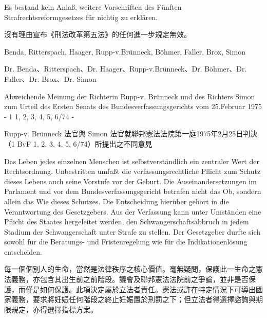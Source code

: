 \documentclass[12pt]{article}
\begin{document}
\syncleft
\begin{sourcepara}
Es bestand kein Anlaß, weitere Vorschriften des Fünften Strafrechtsreformgesetzes für nichtig zu erklären.
\end{sourcepara}
\begin{transpara}
沒有理由宣布《刑法改革第五法》的任何進一步規定無效。
\end{transpara}

\syncleft
\begin{sourcepara}
{\centering \abbrDr{} Benda, Ritterspach, \abbrDr{} Haager, Rupp-v.Brünneck, \abbrDr{} Böhmer, \abbrDr{} Faller, \abbrDr{} Brox, \abbrDr{} Simon\par}
\end{sourcepara}
\begin{transpara}
Dr. Benda、Ritterspach、Dr. Haager、Rupp-v.Brünneck、Dr. Böhmer、Dr. Faller、Dr. Brox、Dr. Simon
\end{transpara}

\syncleft
\begin{sourcepara}
Abweichende Meinung der Richterin Rupp-v. Brünneck und des Richters \abbrDr{} Simon zum Urteil des Ersten Senats des Bundesverfassungsgerichts vom 25.Februar 1975 - 1 \abbrBvF{} 1, 2, 3, 4, 5, 6/74 -
\end{sourcepara}
\begin{transpara}
Rupp-v. Brünneck 法官與 Simon 法官就聯邦憲法法院第一庭1975年2月25日判決（1 BvF 1, 2, 3, 4, 5, 6/74）所提出之不同意見
\end{transpara}

\syncleft
\begin{sourcepara}
Das Leben jedes einzelnen Menschen ist selbstverständlich ein zentraler Wert der Rechtsordnung. Unbestritten umfaßt die verfassungsrechtliche Pflicht zum Schutz dieses Lebens auch seine Vorstufe vor der Geburt. Die Auseinandersetzungen im Parlament und vor dem Bundesverfassungsgericht betrafen nicht das Ob, sondern allein das Wie dieses Schutzes. Die Entscheidung hierüber gehört in die Verantwortung des Gesetzgebers. Aus der Verfassung kann unter Umständen eine Pflicht des Staates hergeleitet werden, den Schwangerschaftsabbruch in jedem Stadium der Schwangerschaft unter Strafe zu stellen. Der Gesetzgeber durfte sich sowohl für die Beratungs- und Fristenregelung wie für die Indikationenlösung entscheiden.
\end{sourcepara}
\begin{transpara}
每一個個別人的生命，當然是法律秩序之核心價值。毫無疑問，保護此一生命之憲法義務，亦包含其出生前之前階段。議會及聯邦憲法法院前之爭論，並非是否保護，而僅是如何保護。此項決定屬於立法者責任。憲法或許在特定情況下可導出國家義務，要求將妊娠任何階段之終止妊娠置於刑罰之下；但立法者得選擇諮詢與期限規定，亦得選擇指標方案。
\end{transpara}
\end{document}
